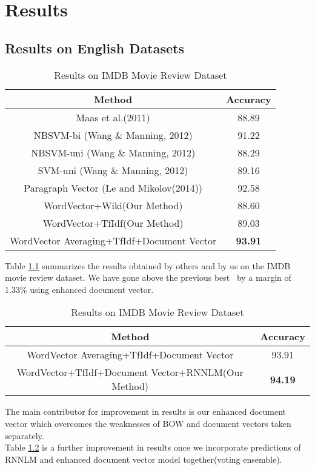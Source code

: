 \chapter{Results}
\label{sec:result}
\section{Results on English Datasets}

\begin {table}[H]
\centering
\begin{tabular}{ | c | c | }
\hline
\textbf{Method} & \textbf{Accuracy} \\ \hline
Maas et al.(2011) & 88.89\\ \hline
NBSVM-bi (Wang \& Manning, 2012) & 91.22\\ \hline
NBSVM-uni (Wang \& Manning, 2012) & 88.29\\ \hline
SVM-uni (Wang \& Manning, 2012) & 89.16\\ \hline
Paragraph Vector (Le and Mikolov(2014)) & 92.58\\ \hline
WordVector+Wiki(Our Method) & 88.60\\ \hline
WordVector+TfIdf(Our Method) & 89.03\\ \hline
WordVector Averaging+TfIdf+Document Vector & \textbf{93.91}\\ \hline

\end{tabular}
\caption {Results on IMDB Movie Review Dataset}
\label{table:IMDB}
\end{table}

Table \ref{table:IMDB} summarizes the results obtained by others and by us on the IMDB movie review dataset. We have gone above the previous best~\cite{Le:14} by a margin of 1.33\% using enhanced document vector.

\begin {table}[H]
\centering
\begin{tabular}{ | c | c | }
\hline
\textbf{Method} & \textbf{Accuracy} \\ \hline
WordVector Averaging+TfIdf+Document Vector & 93.91\\ \hline
WordVector+TfIdf+Document Vector+RNNLM(Our Method) & \textbf{94.19}\\ \hline
\end{tabular}
\caption {Results on IMDB Movie Review Dataset}
\label{table:IMDB_rnnlm}
\end{table}

The main contributor for improvement in results is our enhanced document vector which overcomes the weaknesses of BOW and document vectors taken separately.\\
Table \ref{table:IMDB_rnnlm} is a further improvement in results once we incorporate predictions of RNNLM and enhanced document vector model together(voting ensemble).

